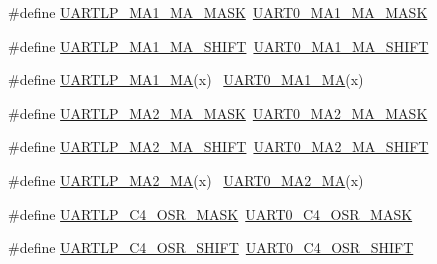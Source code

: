 \begin{DoxyCompactItemize}
\item 
\#define \hyperlink{group___backward___compatibility___symbols_ga187ea00ba1985df3b626c8d88897d693}{U\+A\+R\+T\+L\+P\+\_\+\+M\+A1\+\_\+\+M\+A\+\_\+\+M\+A\+SK}~\hyperlink{group___u_a_r_t0___register___masks_ga9eedde4d09d80e7f305d5217aa6b894f}{U\+A\+R\+T0\+\_\+\+M\+A1\+\_\+\+M\+A\+\_\+\+M\+A\+SK}
\item 
\#define \hyperlink{group___backward___compatibility___symbols_ga62055de0c9859d4d9308b092e5fee5e9}{U\+A\+R\+T\+L\+P\+\_\+\+M\+A1\+\_\+\+M\+A\+\_\+\+S\+H\+I\+FT}~\hyperlink{group___u_a_r_t0___register___masks_ga97f0146ebe2278bfbb80f350bcb8f238}{U\+A\+R\+T0\+\_\+\+M\+A1\+\_\+\+M\+A\+\_\+\+S\+H\+I\+FT}
\item 
\#define \hyperlink{group___backward___compatibility___symbols_ga4b462fa501fa6679d3de5ea3d0f3c5c7}{U\+A\+R\+T\+L\+P\+\_\+\+M\+A1\+\_\+\+MA}(x)                                              ~\hyperlink{group___u_a_r_t0___register___masks_ga957c306f9ef6bcd62bf951e3435a22ac}{U\+A\+R\+T0\+\_\+\+M\+A1\+\_\+\+MA}(x)
\item 
\#define \hyperlink{group___backward___compatibility___symbols_gaf7ea6dd269e7c9e321d53599db756e75}{U\+A\+R\+T\+L\+P\+\_\+\+M\+A2\+\_\+\+M\+A\+\_\+\+M\+A\+SK}~\hyperlink{group___u_a_r_t0___register___masks_ga92464fbb6ee7662411228e760fab58d3}{U\+A\+R\+T0\+\_\+\+M\+A2\+\_\+\+M\+A\+\_\+\+M\+A\+SK}
\item 
\#define \hyperlink{group___backward___compatibility___symbols_ga85f77220a0349e3a2862f9d08f670133}{U\+A\+R\+T\+L\+P\+\_\+\+M\+A2\+\_\+\+M\+A\+\_\+\+S\+H\+I\+FT}~\hyperlink{group___u_a_r_t0___register___masks_gab09c5cd573077ea52dd66656d8b4157d}{U\+A\+R\+T0\+\_\+\+M\+A2\+\_\+\+M\+A\+\_\+\+S\+H\+I\+FT}
\item 
\#define \hyperlink{group___backward___compatibility___symbols_ga7712e7e668aca973f728609d887e6492}{U\+A\+R\+T\+L\+P\+\_\+\+M\+A2\+\_\+\+MA}(x)                                              ~\hyperlink{group___u_a_r_t0___register___masks_ga36b5600f974f12858e2a993ddf588ef2}{U\+A\+R\+T0\+\_\+\+M\+A2\+\_\+\+MA}(x)
\item 
\#define \hyperlink{group___backward___compatibility___symbols_gac6bfd7069bc2ce77d0aff3aecdd3d330}{U\+A\+R\+T\+L\+P\+\_\+\+C4\+\_\+\+O\+S\+R\+\_\+\+M\+A\+SK}~\hyperlink{group___u_a_r_t0___register___masks_gaf0fa80f61dd1507cc4e5383553ec1182}{U\+A\+R\+T0\+\_\+\+C4\+\_\+\+O\+S\+R\+\_\+\+M\+A\+SK}
\item 
\#define \hyperlink{group___backward___compatibility___symbols_gafb1dd8f9e942cb49f32e0be294bee876}{U\+A\+R\+T\+L\+P\+\_\+\+C4\+\_\+\+O\+S\+R\+\_\+\+S\+H\+I\+FT}~\hyperlink{group___u_a_r_t0___register___masks_ga4c95a628d79af511aa40f6dfca1bb7f5}{U\+A\+R\+T0\+\_\+\+C4\+\_\+\+O\+S\+R\+\_\+\+S\+H\+I\+FT}

\end{DoxyCompactItemize}
